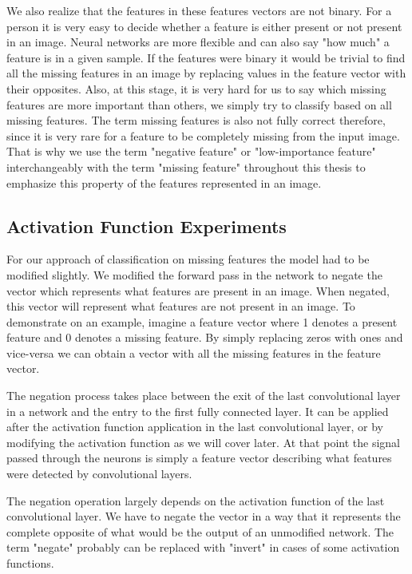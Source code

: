 \documentclass[b5paper]{book}
\begin{document}
We also realize that the features in these features vectors are not binary. For a person it is very easy to decide whether a feature is either present or not present in an image. Neural networks are more flexible and can also say "how much" a feature is in a given sample. If the features were binary it would be trivial to find all the missing features in an image by replacing values in the feature vector with their opposites. Also, at this stage, it is very hard for us to say which missing features are more important than others, we simply try to classify based on all missing features. The term missing features is also not fully correct therefore, since it is very rare for a feature to be completely missing from the input image. That is why we use the term "negative feature" or "low-importance feature" interchangeably with the term "missing feature" throughout this thesis to emphasize this property of the features represented in an image.

\subsection{Activation Function Experiments}

For our approach of classification on missing features the model had to be modified slightly. We modified the forward pass in the network to negate the vector which represents what features are present in an image. When negated, this vector will represent what features are not present in an image. To demonstrate on an example, imagine a feature vector where 1 denotes a present feature and 0 denotes a missing feature. By simply replacing zeros with ones and vice-versa we can obtain a vector with all the missing features in the feature vector.

The negation process takes place between the exit of the last convolutional layer in a network and the entry to the first fully connected layer. It can be applied after the activation function application in the last convolutional layer, or by modifying the activation function as we will cover later. At that point the signal passed through the neurons is simply a feature vector describing what features were detected by convolutional layers. 

The negation operation largely depends on the activation function of the last convolutional layer. We have to negate the vector in a way that it represents the complete opposite of what would be the output of an unmodified network. The term "negate" probably can be replaced with "invert" in cases of some activation functions. 
\end{document}
